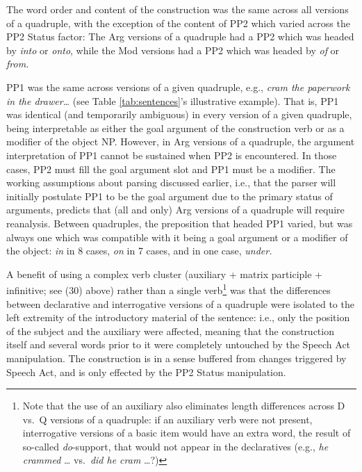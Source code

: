 \documentclass[12pt,oneside]{book}
\let\rmarkdownfootnote\footnote%
\def\footnote{\protect\rmarkdownfootnote}
\begin{document}
The word order and content of the construction was the same across all versions of a quadruple, with the exception of the content of PP2 which varied across the PP2 Status factor: The Arg versions of a quadruple had a PP2 which was headed by \emph{into} or \emph{onto}, while the Mod versions had a PP2 which was headed by \emph{of} or \emph{from.}

PP1 was the same across versions of a given quadruple, e.g., \emph{cram the paperwork in the drawer\ldots{}} (see Table \ref{tab:sentences}'s illustrative example). That is, PP1 was identical (and temporarily ambiguous) in every version of a given quadruple, being interpretable as either the goal argument of the construction verb or as a modifier of the object NP. However, in Arg versions of a quadruple, the argument interpretation of PP1 cannot be sustained when PP2 is encountered. In those cases, PP2 must fill the goal argument slot and PP1 must be a modifier. The working assumptions about parsing discussed earlier, i.e., that the parser will initially postulate PP1 to be the goal argument due to the primary status of arguments, predicts that (all and only) Arg versions of a quadruple will require reanalysis. Between quadruples, the preposition that headed PP1 varied, but was always one which was compatible with it being a goal argument or a modifier of the object: \emph{in} in 8 cases, \emph{on} in 7 cases, and in one case, \emph{under.}

A benefit of using a complex verb cluster (auxiliary + matrix participle + infinitive; see (30) above) rather than a single verb\footnote{Note that the use of an auxiliary also eliminates length differences across D vs.~Q versions of a quadruple: if an auxiliary verb were not present, interrogative versions of a basic item would have an extra word, the result of so-called \emph{do}-support, that would not appear in the declaratives (e.g., \emph{he crammed} \ldots{} vs.~\emph{did he cram} \ldots{}?)} was that the differences between declarative and interrogative versions of a quadruple were isolated to the left extremity of the introductory material of the sentence: i.e., only the position of the subject and the auxiliary were affected, meaning that the construction itself and several words prior to it were completely untouched by the Speech Act manipulation. The construction is in a sense buffered from changes triggered by Speech Act, and is only effected by the PP2 Status manipulation.
\end{document}

